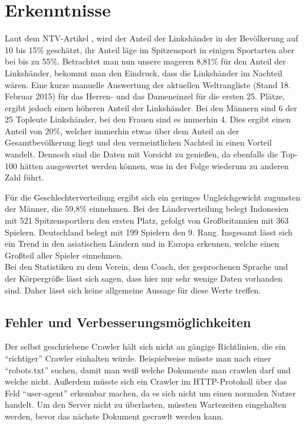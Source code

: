 \chapter{Erkenntnisse}
\label{Erkenntnisse}
Laut dem NTV-Artikel \cite{Hand2015}, wird der Anteil der Linkshänder in der Bevölkerung auf 10 bis 15\% geschätzt, ihr Anteil läge im Spitzensport in einigen Sportarten aber bei bis zu 55\%. Betrachtet man nun unsere mageren 8,81\% für den Anteil der Linkshänder, bekommt man den Eindruck, dass die Linkshänder im Nachteil wären. Eine kurze manuelle Auswertung der aktuellen Weltrangliste (Stand 18. Februar 2015) für das Herren- und das Dameneinzel für die ersten 25. Plätze, ergibt jedoch einen höheren Anteil der Linkshänder. Bei den Männern sind 6 der 25 Topleute Linkshänder, bei den Frauen sind es immerhin 4. Dies ergibt einen Anteil von 20\%, welcher immerhin etwas über dem Anteil an der Gesamtbevölkerung liegt und den vermeintlichen Nachteil in einen Vorteil wandelt. Dennoch sind die Daten mit Vorsicht zu genießen, da ebenfalls die Top-100 hätten ausgewertet werden können, was in der Folge wiederum zu anderen Zahl führt.

Für die Geschlechterverteilung ergibt sich ein geringes Ungleichgewicht zugunsten der Männer, die 59,8\% einnehmen. Bei der Länderverteilung belegt Indonesien mit 521 Spitzensportlern den ersten Platz, gefolgt von Großbritannien mit 363 Spielern. Deutschland belegt mit 199 Spielern den 9. Rang. Insgesamt lässt sich ein Trend in den asiatischen Ländern und in Europa erkennen, welche einen Großteil aller Spieler einnehmen.\\

Bei den Statistiken zu dem Verein, dem Coach, der gesprochenen Sprache und der Körpergröße lässt sich sagen, dass hier nur sehr wenige Daten vorhanden sind. Daher lässt sich keine allgemeine Aussage für diese Werte treffen.

\section{Fehler und Verbesserungsmöglichkeiten}
Der selbst geschriebene Crawler hält sich nicht an gängige Richtlinien, die ein "`richtiger"' Crawler einhalten würde. Beispielweise müsste man nach einer "`robots.txt"' suchen, damit man weiß welche Dokumente man crawlen darf und welche nicht. Außerdem müsste sich ein Crawler im HTTP-Protokoll über das Feld "`user-agent"' erkennbar machen, da es sich nicht um einen normalen Nutzer handelt. Um den Server nicht zu überlasten, müssten Wartezeiten eingehalten werden, bevor das nächste Dokument gecrawlt werden kann.\\

